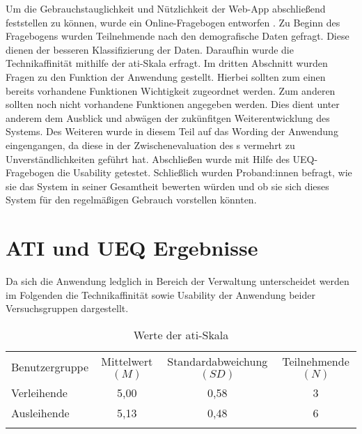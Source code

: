 Um die Gebrauchstauglichkeit und Nützlichkeit der Web-App abschließend feststellen zu können, wurde
ein Online-Fragebogen entworfen . Zu Beginn des Fragebogens wurden
Teilnehmende nach den demografische Daten gefragt. Diese dienen der besseren Klassifizierung der
Daten. Daraufhin wurde die Technikaffinität mithilfe der \ac{ati}-Skala erfragt. Im dritten
Abschnitt wurden Fragen zu den Funktion der Anwendung gestellt. Hierbei sollten zum einen bereits
vorhandene Funktionen Wichtigkeit zugeordnet werden. Zum anderen sollten noch nicht vorhandene
Funktionen angegeben werden. Dies dient unter anderem dem Ausblick und abwägen der zukünfitgen
Weiterentwicklung des Systems. Des Weiteren wurde in diesem Teil auf das Wording der Anwendung
eingengangen, da diese in der Zwischenevaluation des s  vermehrt zu
Unverständlichkeiten geführt hat. Abschließen wurde mit Hilfe des UEQ-Fragebogen die Usability
getestet. Schließlich wurden Proband:innen befragt, wie sie das System in seiner Gesamtheit bewerten
würden und ob sie sich dieses System für den regelmäßigen Gebrauch vorstellen könnten.



\section{ATI und UEQ Ergebnisse}
Da sich die Anwendung ledglich in Bereich der Verwaltung unterscheidet werden im
Folgenden die Technikaffinität sowie Usability der Anwendung beider
Versuchsgruppen dargestellt.

\begin{table}[h]
  \centering
  \caption{Werte der \ac{ati}-Skala}
  \begin{tabular}{lccc}
    \arrayrulecolor{maincolor}\hline
    \sffamily\color{maincolor}Benutzergruppe &
    \sffamily\color{maincolor}Mittelwert $(M)$
                                             & \sffamily\color{maincolor}Standardabweichung $(SD)$ &
    \sffamily\color{maincolor}Teilnehmende $(N)$
    \\
    \arrayrulecolor{maincolor}\hline
    Verleihende                              & 5,00
                                             & 0,58                                                & 3
    \\
    Ausleihende                              & 5,13
                                             & 0,48                                                & 6
    \\
    \arrayrulecolor{maincolor}\hline
  \end{tabular}
  \label{table:atipartzwei}
\end{table}




